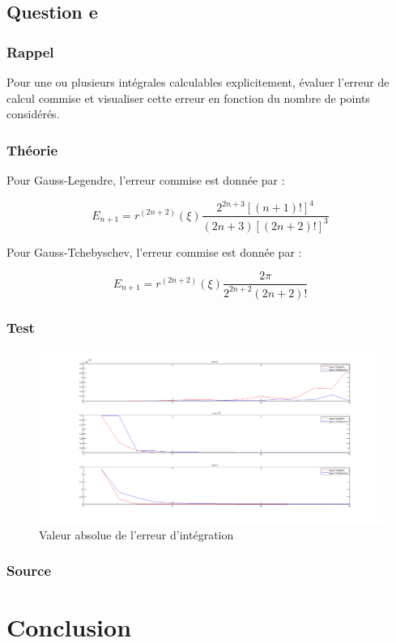 \documentclass[a4paper,10pt]{report}
\begin{document}
\section*{Question e}

\subsection*{Rappel}

Pour une ou plusieurs intégrales calculables explicitement, évaluer l’erreur de calcul commise et visualiser cette erreur en fonction du nombre de points considérés.

\subsection*{Théorie}

Pour Gauss-Legendre, l’erreur commise est donnée par :

\begin{equation*}
E_{n+1} = r^{(2n+2)}(\xi) \frac{2^{2n+3}\left[(n+1)!\right]^4}{(2n+3)\left[(2n+2)!\right]^3}
\end{equation*}

Pour Gauss-Tchebyschev, l’erreur commise est donnée par :

\begin{equation*}
E_{n+1} = r^{(2n+2)}(\xi) \frac{2\pi}{2^{2n+2}(2n+2)!}
\end{equation*}

\subsection*{Test}

\begin{figure}[h]
	\begin{center}
		\includegraphics[scale=0.35]{error_gauss}
		\caption{Valeur absolue de l'erreur d'intégration}
	\end{center}
\end{figure}

\subsection*{Source}

\begin{center}
	
\end{center}

\chapter*{Conclusion}
\end{document}
